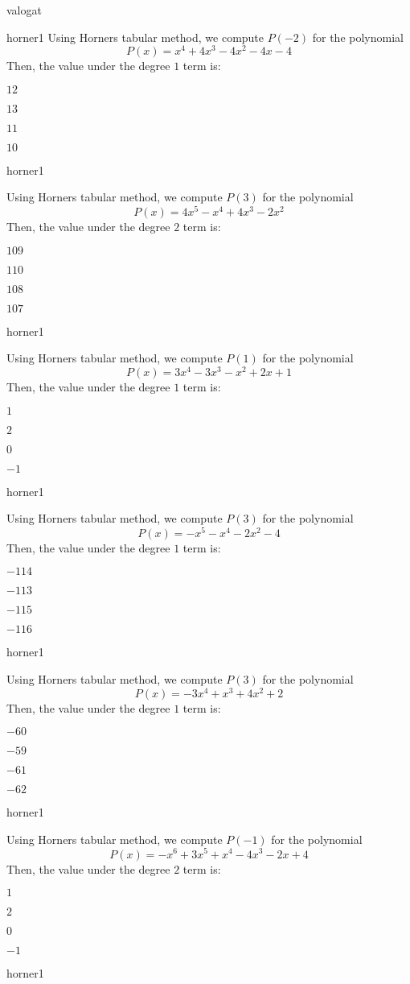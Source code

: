 \documentclass[12pt]{article}
\begin{document}
\begin{quiz}{valogat}
\begin{multi}{horner1}
Using Horners tabular method, we compute $P(-2)$ for the polynomial
$$P(x)=x^4+4x^3-4x^2-4x-4$$
Then, the value under the degree $1$ term is:
\item* $ 12 $
\item  $ 13 $
\item  $ 11 $
\item  $ 10 $
\end{multi}
\begin{multi}{horner1}

Using Horners tabular method, we compute $P(3)$ for the polynomial
$$P(x)=4x^5-x^4+4x^3-2x^2$$
Then, the value under the degree $2$ term is:
\item* $ 109 $
\item  $ 110 $
\item  $ 108 $
\item  $ 107 $
\end{multi}
\begin{multi}{horner1}

Using Horners tabular method, we compute $P(1)$ for the polynomial
$$P(x)=3x^4-3x^3-x^2+2x+1$$
Then, the value under the degree $1$ term is:
\item* $ 1 $
\item  $ 2 $
\item  $ 0 $
\item  $ -1 $
\end{multi}
\begin{multi}{horner1}

Using Horners tabular method, we compute $P(3)$ for the polynomial
$$P(x)=-x^5-x^4-2x^2-4$$
Then, the value under the degree $1$ term is:
\item* $ -114 $
\item  $ -113 $
\item  $ -115 $
\item  $ -116 $
\end{multi}
\begin{multi}{horner1}

Using Horners tabular method, we compute $P(3)$ for the polynomial
$$P(x)=-3x^4+x^3+4x^2+2$$
Then, the value under the degree $1$ term is:
\item* $ -60 $
\item  $ -59 $
\item  $ -61 $
\item  $ -62 $
\end{multi}
\begin{multi}{horner1}

Using Horners tabular method, we compute $P(-1)$ for the polynomial
$$P(x)=-x^6+3x^5+x^4-4x^3-2x+4$$
Then, the value under the degree $2$ term is:
\item* $ 1 $
\item  $ 2 $
\item  $ 0 $
\item  $ -1 $
\end{multi}
\begin{multi}{horner1}


\end{multi}
\end{quiz}
\end{document}
